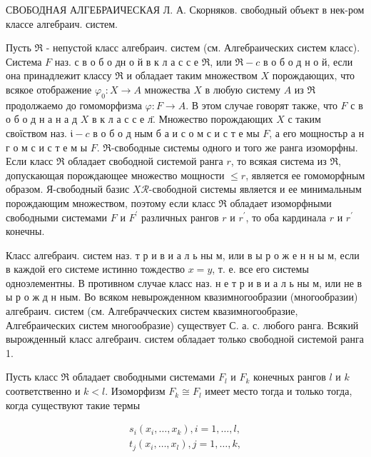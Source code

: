 \documentclass[10pt]{article}
\begin{document}
СВОБОДНАЯ АЛГЕБРАИЧЕСКАЯ Л. А. Скорняков. свободный объект в нек-ром классе алгебраич. систем.



Пусть $\mathscr{\Re}$ - непустой класс алгебраич. систем (см. Алгебраических систем класс). Система $F$ наз. с в о б о дн о й в к л а с с е $\Re$, или $\Re-c$ в о б о д н о й, если она принадлежит классу $\Re$ и обладает таким множеством $X$ порождающих, что всякое отображение $\varphi_{0}: X \rightarrow A$ множества $X$ в любую систему $A$ из $\Re$ продолжаемо до гомоморфизма $\varphi: F \rightarrow A$. В этом случае говорят также, что $F$ с в о б о д н а н а д $X$ в к л а с с е л̈. Множество порождающих $X$ с таким своїством наз. $\mathfrak{i}-c$ в о б о д ным б а и с о м с и с т е мы $F$, а его мощностьр а н г о м с и с т е м ы $F$. $\mathfrak{\Re}$-свободные системы одного и того же ранга изоморфны. Если класс $\Re$ обладает свободной системой ранга $r$, то всякая система из $\Re$, допускающая порождающее множество мощности $\leqslant r$, является ее гомоморфным образом. Я-свободный базис $X \mathscr{R}$-свободной системы является и ее минимальным порождающим множеством, поэтому если класс $\mathfrak{\Re}$ обладает изоморфными свободными системами $F$ и $F^{\prime}$ различных рангов $r$ и $r^{\prime}$, то оба кардинала $r$ и $r^{\prime}$ конечны.



Класс алгебраич. систем наз. т р и в и а л ь ны м, или в ы р о ж е н н ы м, если в каждой его системе истинно тождество $x=y$, т. е. все его системы одноэлементны. В противном случае класс наз. н е т р и в и а л ь ны м, или не в ы р о ж д н ным. Во всяком невырожденном квазимногообразии (многообразии) алгебраич. систем (см. Алгебрачческих систем квазимногообразие, Алгебраических систем многообразие) существует С. а. с. любого ранга. Всякий вырожденный класс алгебраич. систем обладает только свободной системой ранга 1.



Пусть класс $\Re$ обладает свободными системами $F_{l}$ и $F_{k}$ конечных рангов $l$ и $k$ соответственно и $k<l$. Изоморфизм $F_{k} \cong F_{l}$ имеет место тогда и только тогда, когда существуют такие термы



\[

\begin{gathered}

s_{i}\left(x_{i}, \ldots, x_{k}\right), i=1, \ldots, l, \\

t_{j}\left(x_{i}, \ldots, x_{l}\right), j=1, \ldots, k,

\end{gathered}

\]
\end{document}
